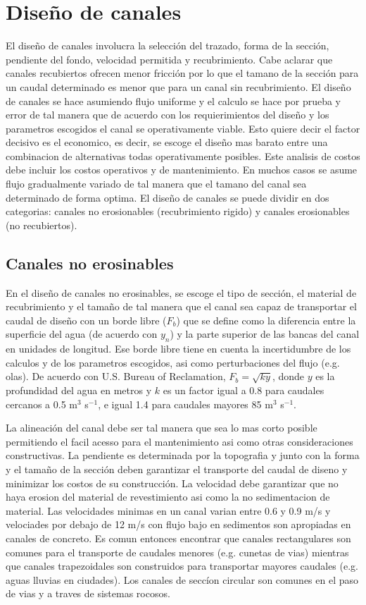 \documentclass[11pt, oneside]{article}
\begin{document}
\section{Diseño de canales} %
El diseño de canales involucra la selecci\'on del trazado, forma de la secci\'on, pendiente del fondo, velocidad permitida y recubrimiento. Cabe aclarar que canales recubiertos ofrecen menor fricci\'on por lo que el tamano de la secci\'on para un caudal determinado es menor que para un canal sin recubrimiento. El diseño de canales se hace asumiendo flujo uniforme y el calculo se hace por prueba y error de tal manera que de acuerdo con los requierimientos del diseño y los parametros escogidos el canal se operativamente viable. Esto quiere decir el factor decisivo es el economico, es decir, se escoge el diseño mas barato entre una combinacion de alternativas todas operativamente posibles. Este analisis de costos debe incluir los costos operativos y de mantenimiento. En muchos casos se asume flujo gradualmente variado de tal manera que el tamano del canal sea determinado de forma optima. El diseño de canales se puede dividir en dos categorias: canales no erosionables (recubrimiento rigido) y canales erosionables (no recubiertos).

\subsection{Canales no erosinables}
En el diseño de canales no erosinables, se escoge el tipo de secci\'on, el material de recubrimiento y el tamaño de tal manera que el canal sea capaz de transportar el caudal de diseño con un borde libre ($F_b$) que se define como la diferencia entre la superficie del agua (de acuerdo con $y_n$) y la parte superior de las bancas del canal en unidades de longitud. Ese borde libre tiene en cuenta la incertidumbre de los calculos y de los parametros escogidos, asi como perturbaciones del flujo (e.g. olas). De acuerdo con U.S. Bureau of Reclamation, $F_b = \sqrt{k y}$, donde $y$ es la profundidad del agua en metros y $k$ es un factor igual a 0.8 para caudales cercanos a 0.5 m$^3$ s$^{-1}$, e igual 1.4 para caudales mayores 85  m$^3$ s$^{-1}$. 

La alineaci\'on del canal debe ser tal manera que sea lo mas corto posible permitiendo el facil acesso para el mantenimiento asi como otras consideraciones constructivas. La pendiente es determinada por la topografia y junto con la forma y el tamaño de la secci\'on deben garantizar el transporte del caudal de diseno y minimizar los costos de su construcci\'on. La velocidad debe garantizar que no haya erosion del material de revestimiento asi como la no sedimentacion de material. Las velocidades minimas en un canal varian entre 0.6 y 0.9 m/s y velociades por debajo de 12 m/s con flujo bajo en sedimentos son apropiadas en canales de concreto. Es comun entonces encontrar que canales rectangulares son comunes para el transporte de caudales menores (e.g. cunetas de vias) mientras que canales trapezoidales son construidos para transportar mayores caudales (e.g. aguas lluvias en ciudades). Los canales de secc\'ion circular son comunes en el paso de vias y a traves de sistemas rocosos. 
\end{document}
